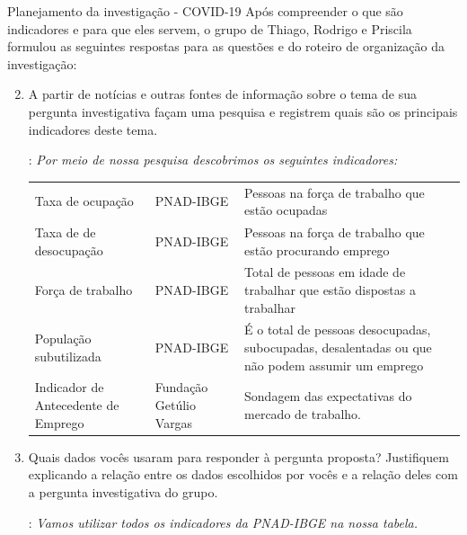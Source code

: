 \clearpage
\begin{example}{Planejamento da investigação - COVID-19}
Após compreender o que são indicadores e para que eles servem, o grupo de Thiago, Rodrigo e Priscila formulou as seguintes respostas para as questões  e  do roteiro de organização da investigação:

\begin{enumerate}[label=\titem{\arabic*)}]\setcounter{enumi}{1}
\item A partir de notícias e outras fontes de informação sobre o tema de sua pergunta investigativa façam uma pesquisa e registrem quais são os principais indicadores deste tema.

: \textit{Por meio de nossa pesquisa descobrimos os seguintes indicadores:}

\begin{table}[H]
\centering

\begin{tabu} to 
\hline
{} &  &  \\
\hline
Taxa de ocupação & PNAD-IBGE & Pessoas na força de trabalho que estão ocupadas \\
\hline
Taxa de de desocupação & PNAD-IBGE & Pessoas na força de trabalho que estão procurando emprego \\
\hline
Força de trabalho & PNAD-IBGE & Total de pessoas em idade de trabalhar que estão dispostas a trabalhar \\
\hline População subutilizada & PNAD-IBGE & É o total de pessoas desocupadas, subocupadas, desalentadas ou que não podem assumir um emprego\\
\hline
Indicador de Antecedente de Emprego & Fundação Getúlio Vargas & Sondagem das expectativas do mercado de trabalho.\\
\hline
\end{tabu}
\end{table}

\item Quais dados vocês usaram para responder à pergunta proposta? Justifiquem explicando a relação entre os dados escolhidos por vocês e a relação deles com a pergunta investigativa do grupo.

: \textit{Vamos utilizar todos os indicadores da PNAD-IBGE na nossa tabela.}
\end{enumerate}
\end{example}

